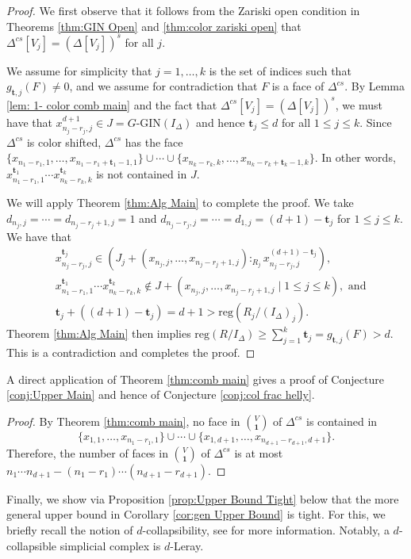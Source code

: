 \documentclass[a4paper, 10pt, reqno, english, ones]{amsart}  %
\theoremstyle{definition}
\theoremstyle{remark}
\begin{document}
\CombMain*
\begin{proof}
    We first observe that it follows from the Zariski open condition in Theorems \ref{thm:GIN Open} and \ref{thm:color zariski open} that $\Delta^{cs}[V_j]=(\Delta[V_j])^s$ for all $j$.
    
    We assume for simplicity that $j=1,\dots,k$ is the set of indices such that $g_{\mathbf{t},j}(F) \neq 0$, and we assume for contradiction that $F$ is a face of $\Delta^{cs}$. By Lemma \ref{lem: 1- color comb main} and the fact that $\Delta^{cs}[V_j]=(\Delta[V_j])^s$, we must have that $x_{n_j-r_j,j}^{d+1}\in J=G\textrm{-GIN}(I_\Delta)$  and hence $\mathbf{t}_j\leq d$ for all $1\leq j\leq k$.  Since $\Delta^{cs}$ is color shifted, $\Delta^{cs}$ has the face $\{x_{n_1-r_1,1},\dots,x_{n_1-r_1+\mathbf{t}_1-1,1} \}\cup \cdots \cup \{ x_{n_k-r_k,k},\dots,x_{n_k-r_k+\mathbf{t}_k-1,k} \}$. In other words, $x_{n_1-r_1,1}^{\mathbf{t}_1}\cdots x_{n_k-r_k,k}^{\mathbf{t}_k}$ is not contained in $J$. 

    We will apply Theorem \ref{thm:Alg Main} to complete the proof. We take $d_{n_j,j}=\cdots = d_{n_j-r_j+1,j}=1$ and $d_{n_j-r_j,j}=\cdots =d_{1,j}=(d+1)-\mathbf{t}_j$ for $1\leq j\leq k$.
    We have that 
    \begin{align*}
    &x^{\mathbf{t}_j}_{n_j-r_j,j} \in (J_j+(x_{n_j,j},\dots,x_{n_j-r_j+1,j}):_{R_j} x^{(d+1)-\mathbf{t}_j}_{n_j-r_j,j}),\\
    &x_{n_1-r_1,1}^{\mathbf{t}_1}\cdots x_{n_k-r_k,k}^{\mathbf{t}_k}\notin J + (x_{n_j,j},\dots,x_{n_j-r_j+1,j}\mid 1\leq j\leq k), \textrm{ and}\\
    & \mathbf{t}_j + ((d+1) - \mathbf{t}_j) = d+1 > \textrm{reg}(R_j/(I_\Delta)_j).
    \end{align*}
Theorem \ref{thm:Alg Main} then implies $\textrm{reg}(R/I_\Delta) \geq \sum_{j=1}^k \mathbf{t}_j = g_{\mathbf{t},j}(F) > d$. This is a contradiction and completes the proof.
\end{proof}

A direct application of Theorem \ref{thm:comb main} gives a proof of Conjecture \ref{conj:Upper Main} and hence of Conjecture \ref{conj:col frac helly}.

\ConjecturesHold*
\begin{proof}
    By Theorem \ref{thm:comb main}, no face in ${V \choose \mathbf{1}}$ of $\Delta^{cs}$ is contained in 
    \[
    \{x_{1,1},\dots,x_{n_1-r_1,1} \}\cup \cdots \cup \{x_{1,d+1},\dots,x_{n_{d+1}-r_{d+1},d+1}\}.
    \] 
    Therefore, the number of faces in ${V \choose \mathbf{1}}$ of $\Delta^{cs}$ is at most $n_1\cdots n_{d+1} - (n_1-r_1)\cdots (n_{d+1}-r_{d+1})$.
\end{proof}
\noindent Finally, we show via Proposition \ref{prop:Upper Bound Tight} below that the more general upper bound in Corollary \ref{cor:gen Upper Bound} is tight. For this, we briefly recall the notion of $d$-collapsibility, see \cite{martin2013intersection} for more information. Notably, a $d$-collapsible simplicial complex is $d$-Leray.
\end{document}
